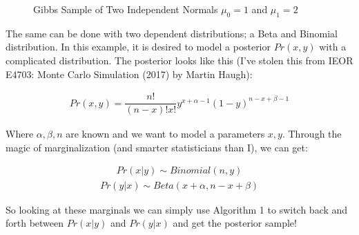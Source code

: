 \documentclass[12pt]{article}
\begin{document}
\begin{figure}[h]
\centering
{}
\caption{Gibbs Sample of Two Independent Normals $\mu_0 = 1$ and $\mu_1 = 2$}
\end{figure}

\vspace{5mm}

The same can be done with two dependent distributions; a Beta and Binomial distribution. In this example, it is desired to model a posterior $Pr(x,y)$ with a complicated distribution. The posterior looks like this (I've stolen this from IEOR E4703: Monte Carlo Simulation (2017) by Martin Haugh):

\begin{align*}
Pr(x,y) = \dfrac{n!}{(n-x)!x!}y^{x+\alpha-1}(1-y)^{n-x+\beta-1}
\end{align*}

\vspace{5mm}

Where $\alpha,\beta,n$ are known and we want to model a parameters $x,y$. Through the magic of marginalization (and smarter statisticians than I), we can get:

\begin{align*}
Pr(x|y) \sim Binomial(n,y)
\end{align*}
\begin{align*}
Pr(y|x) \sim Beta(x+\alpha,n-x+\beta)
\end{align*}

\vspace{5mm}

So looking at these marginals we can simply use Algorithm 1 to switch back and forth between $Pr(x|y)$ and $Pr(y|x)$ and get the posterior sample!
\end{document}
